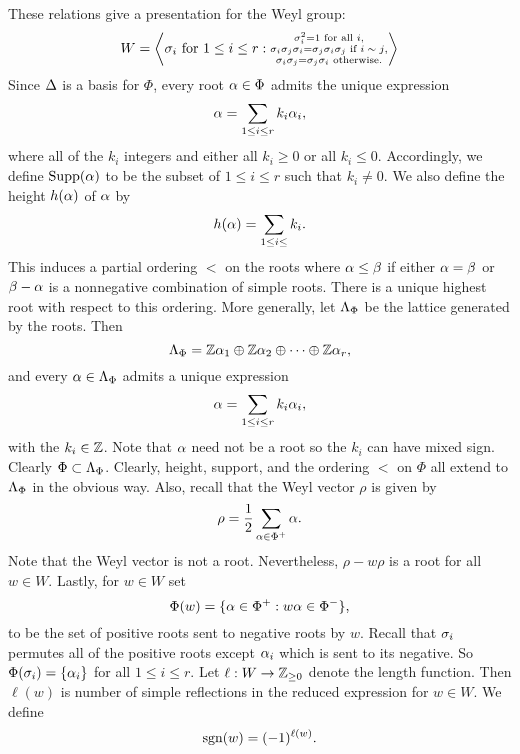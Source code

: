         These relations give a presentation for the Weyl group:
        \[
            W = \left\langle \sigma_{i} \text{ for } 1 \le i \le r: \substack{\sigma_{i}^{2} = 1 \text{ for all $i$}, \\ \sigma_{i}\sigma_{j}\sigma_{i} = \sigma_{j}\sigma_{i}\sigma_{j} \text{ if $i \sim j$}, \\ \sigma_{i}\sigma_{j} = \sigma_{j}\sigma_{i} \text{ otherwise}.} \right\rangle
        \]
        Since $\Delta$ is a basis for $\Phi$, every root $\alpha \in \Phi$ admits the unique expression
        \[
            \alpha = \sum_{1 \le i \le r}k_{i}\alpha_{i},
        \]
        where all of the $k_{i}$ integers and either all $k_{i} \ge 0$ or all $k_{i} \le 0$. Accordingly, we define $\operatorname{\mathrm{Supp}}(\alpha)$ to be the subset of $1 \le i \le r$ such that $k_{i} \neq 0$. We also define the height $h(\alpha)$ of $\alpha$ by
        \[
            h(\alpha) = \sum_{1 \le i \le }k_{i}.
        \]
        This induces a partial ordering $<$ on the roots where $\alpha \le \beta$ if either $\alpha = \beta$ or $\beta-\alpha$ is a nonnegative combination of simple roots. There is a unique highest root with respect to this ordering. More generally, let $\Lambda_{\Phi}$ be the lattice generated by the roots. Then
        \[
            \Lambda_{\Phi} = \mathbb{Z}\alpha_{1} \oplus \mathbb{Z}\alpha_{2} \oplus \cdots \oplus \mathbb{Z}\alpha_{r},
        \]
        and every $\alpha \in \Lambda_{\Phi}$ admits a unique expression
        \[
            \alpha = \sum_{1 \le i \le r}k_{i}\alpha_{i},
        \]
        with the $k_{i} \in \mathbb{Z}$. Note that $\alpha$ need not be a root so the $k_{i}$ can have mixed sign. Clearly $\Phi \subset \Lambda_{\Phi}$. Clearly, height, support, and the ordering $<$ on $\Phi$ all extend to $\Lambda_{\Phi}$ in the obvious way. Also, recall that the Weyl vector $\rho$ is given by
        \[
            \rho = \frac{1}{2}\sum_{\alpha \in \Phi^{+}}\alpha.
        \]
        Note that the Weyl vector is not a root. Nevertheless, $\rho-w\rho$ is a root for all $w \in W$. Lastly, for $w \in W$ set
        \[
            \Phi(w) = \{\alpha \in \Phi^{+}:w\alpha \in \Phi^{-}\},
        \]
        to be the set of positive roots sent to negative roots by $w$. Recall that $\sigma_{i}$ permutes all of the positive roots except $\alpha_{i}$ which is sent to its negative. So $\Phi(\sigma_{i}) = \{\alpha_{i}\}$ for all $1 \le i \le r$. Let $\ell:W \to \mathbb{Z}_{\ge 0}$ denote the length function. Then $\ell(w)$ is number of simple reflections in the reduced expression for $w \in W$. We define
        \[
            \operatorname{\mathrm{sgn}}(w) = (-1)^{\ell(w)}.
        \]
